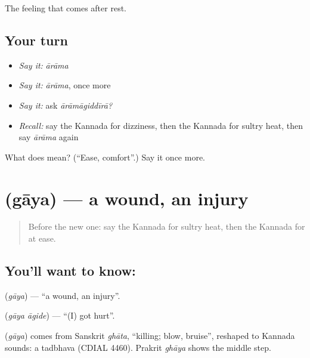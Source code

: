 \begin{grammarlens}[title={What you've built}]
The feeling that comes after rest.
\end{grammarlens}

\subsection*{Your turn}
\begin{itemize}
\raggedright
  \item \emph{Say it:} \emph{ārāma}
  \item \emph{Say it:} \emph{ārāma}, once more
  \item \emph{Say it:} ask \emph{ārāmāgiddīrā?}
  \item \emph{Recall:} say the Kannada for dizziness, then the Kannada for sultry heat, then say \emph{ārāma} again
\end{itemize}

\begin{tcolorbox}[breakable,colback=teal!4,colframe=teal!35!black,title={Before you move on}]
What does  mean? (\textquotedblleft{}Ease, comfort\textquotedblright{}.) Say it once more.
\end{tcolorbox}
\section[\texorpdfstring{\kn{ಗಾಯ} (gāya)}{ಗಾಯ (gāya)}]{ (gāya) — a wound, an injury}

\label{lesson:KA-C93-wound}



\begin{quote}
Before the new one: say the Kannada for sultry heat, then the Kannada for at ease.
\end{quote}

\subsection*{You'll want to know: }
\textbf{} (\emph{gāya}) — \textquotedblleft{}a wound, an injury\textquotedblright{}.

\textbf{ } (\emph{gāya āgide}) — \textquotedblleft{}(I) got hurt\textquotedblright{}.

\begin{cousinweb}
\textbf{} (\emph{gāya}) comes from Sanskrit \emph{ghāta}, \textquotedblleft{}killing; blow, bruise\textquotedblright{}, reshaped to Kannada sounds: a tadbhava (CDIAL 4460). Prakrit \emph{ghāya} shows the middle step.
\end{cousinweb}

